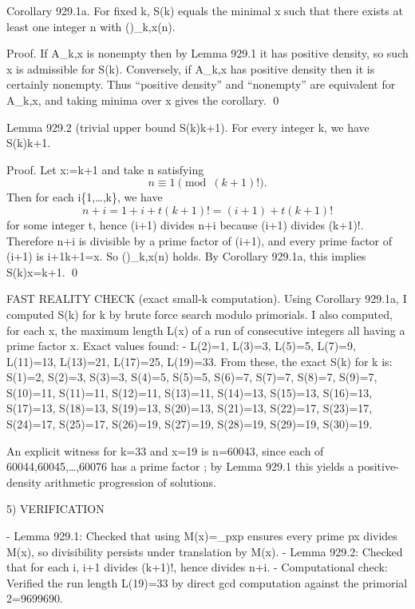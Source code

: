 Corollary 929.1a.
For fixed k, S(k) equals the minimal x such that there exists at least one integer n with (\*)_{k,x}(n).

Proof.
If A_{k,x} is nonempty then by Lemma 929.1 it has positive density, so such x is admissible for S(k).
Conversely, if A_{k,x} has positive density then it is certainly nonempty.
Thus “positive density” and “nonempty” are equivalent for A_{k,x}, and taking minima over x gives the corollary. \qed

Lemma 929.2 (trivial upper bound S(k)\le k+1).
For every integer k, we have S(k)\le k+1.

Proof.
Let x:=k+1 and take n satisfying
\[ n \equiv 1 \pmod{(k+1)!}. \]
Then for each i\in\{1,\dots,k\}, we have
\[ n+i = 1 + i + t (k+1)! = (i+1) + t (k+1)! \]
for some integer t, hence (i+1) divides n+i because (i+1) divides (k+1)!.
Therefore n+i is divisible by a prime factor of (i+1), and every prime factor of (i+1) is \le i+1\le k+1=x.
So (\*)_{k,x}(n) holds.
By Corollary 929.1a, this implies S(k)\le x=k+1. \qed

FAST REALITY CHECK (exact small-k computation).
Using Corollary 929.1a, I computed S(k) for k by brute force search modulo primorials.
I also computed, for each x, the maximum length L(x) of a run of consecutive integers all having a prime factor \le x.
Exact values found:
- L(2)=1,
  L(3)=3,
  L(5)=5,
  L(7)=9,
  L(11)=13,
  L(13)=21,
  L(17)=25,
  L(19)=33.
From these, the exact S(k) for k is:
  S(1)=2,
  S(2)=3,
  S(3)=3,
  S(4)=5,
  S(5)=5,
  S(6)=7,
  S(7)=7,
  S(8)=7,
  S(9)=7,
  S(10)=11,
  S(11)=11,
  S(12)=11,
  S(13)=11,
  S(14)=13,
  S(15)=13,
  S(16)=13,
  S(17)=13,
  S(18)=13,
  S(19)=13,
  S(20)=13,
  S(21)=13,
  S(22)=17,
  S(23)=17,
  S(24)=17,
  S(25)=17,
  S(26)=19,
  S(27)=19,
  S(28)=19,
  S(29)=19,
  S(30)=19.

An explicit witness for k=33 and x=19 is n=60043, since each of 60044,60045,\dots,60076 has a prime factor ; by Lemma 929.1 this yields a positive-density arithmetic progression of solutions.


5) VERIFICATION

- Lemma 929.1: Checked that using M(x)=\prod_{p\le x}p ensures every prime p\le x divides M(x), so divisibility persists under translation by M(x).
- Lemma 929.2: Checked that for each i, i+1 divides (k+1)!, hence divides n+i.
- Computational check: Verified the run length L(19)=33 by direct gcd computation against the primorial 2=9699690.


